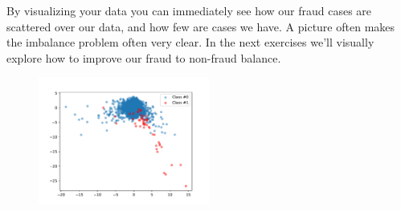 By visualizing your data you can immediately see how our fraud cases are scattered over our data, and how few are cases we have. A picture often makes the imbalance problem often very clear. In the next exercises we'll visually explore how to improve our fraud to non-fraud balance.

\begin{figure}
	\centering
	\includegraphics[width=0.5\textwidth]{plots/data.pdf}
\end{figure}




